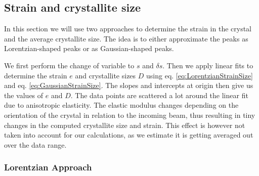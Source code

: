\documentclass[12pt]{article}
\begin{document}
\subsection{Strain and crystallite size}

In this section we will use two approaches to determine the  strain in the crystal and the average crystallite size. The idea is to either approximate the peaks as Lorentzian-shaped peaks or as Gaussian-shaped peaks.   

We first perform the change of variable to $s$ and $\delta s$. Then we apply linear fits to determine the strain $e$ and crystallite sizes $D$ using eq. \ref{eq:LorentzianStrainSize} and eq. \ref{eq:GaussianStrainSize}. The slopes and intercepts at origin then give us the values of $e$ and $D$. The data points are scattered a lot around the linear fit due to anisotropic elasticity. The elastic modulus changes depending on the orientation of the crystal in relation to the incoming beam, thus resulting in tiny changes in the computed crystallite size and strain. This effect is however not taken into account for our calculations, as we estimate it is getting averaged out over the data range.

\subsubsection{Lorentzian Approach}
\end{document}
